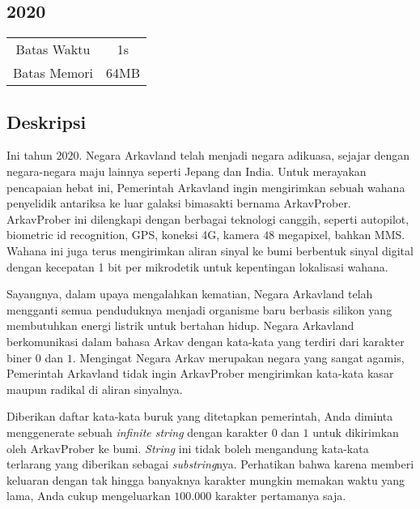 \documentclass{article}
\begin{document}
\begin{center}
    \section*{2020} %

    \begin{tabular}{ | c c | }
        \hline
        Batas Waktu  & 1s \\    %
        Batas Memori & 64MB \\  %
        \hline
    \end{tabular}
\end{center}

\subsection*{Deskripsi}

Ini tahun $2020$. Negara Arkavland telah menjadi negara adikuasa, sejajar dengan negara-negara maju lainnya seperti Jepang dan India. Untuk merayakan pencapaian hebat ini, Pemerintah Arkavland ingin mengirimkan sebuah wahana penyelidik antariksa ke luar galaksi bimasakti bernama ArkavProber. ArkavProber ini dilengkapi dengan berbagai teknologi canggih, seperti  autopilot, biometric id recognition, GPS, koneksi 4G, kamera $48$ megapixel, bahkan MMS. Wahana ini juga terus mengirimkan aliran sinyal ke bumi berbentuk sinyal digital dengan kecepatan 1 bit per mikrodetik untuk kepentingan lokalisasi wahana.

Sayangnya, dalam upaya mengalahkan kematian, Negara Arkavland telah mengganti semua penduduknya menjadi organisme baru berbasis silikon yang membutuhkan energi listrik untuk bertahan hidup. Negara Arkavland berkomunikasi dalam bahasa Arkav dengan kata-kata yang terdiri dari karakter biner $0$ dan $1$. Mengingat Negara Arkav merupakan negara yang sangat agamis, Pemerintah Arkavland tidak ingin ArkavProber mengirimkan kata-kata kasar maupun radikal di aliran sinyalnya.

Diberikan daftar kata-kata buruk yang ditetapkan pemerintah, Anda diminta menggenerate sebuah \textit{infinite string} dengan karakter $0$ dan $1$ untuk dikirimkan oleh ArkavProber ke bumi. \textit{String} ini tidak boleh mengandung kata-kata terlarang yang diberikan sebagai \textit{substring}nya. Perhatikan bahwa karena memberi keluaran dengan tak hingga banyaknya karakter mungkin memakan waktu yang lama, Anda cukup mengeluarkan $100.000$ karakter pertamanya saja.
\end{document}
